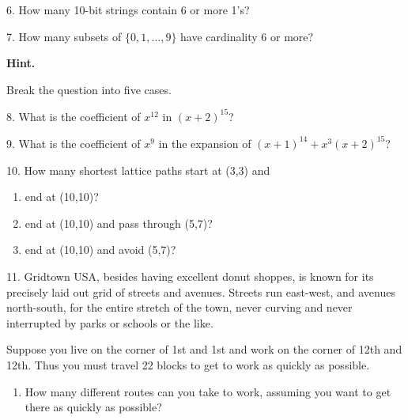\documentclass[10pt,]{book}
\theoremstyle{plain}
\theoremstyle{definition}
\numberwithin{equation}{chapter}
\begin{document}
\begin{exerciselist}
\par\smallskip
\item[6.]\hypertarget{exercise-61}{}
            How many 10-bit strings contain 6 or more 1's?
\par\smallskip
\item[7.]\hypertarget{exercise-62}{}
            How many subsets of \(\{0,1,\ldots, 9\}\) have cardinality 6 or more?
\par\smallskip
\par\smallskip
\noindent\textbf{Hint.}\hypertarget{hint-5}{}\quad

            Break the question into five cases.
\item[8.]\hypertarget{exercise-63}{}
            What is the coefficient of \(x^{12}\) in \((x+2)^{15}\)?
\par\smallskip
\item[9.]\hypertarget{exercise-64}{}
            What is the coefficient of \(x^9\) in the expansion of \((x+1)^{14} + x^3(x+2)^{15}\)?
\par\smallskip
\item[10.]\hypertarget{exercise-65}{}
            How many shortest lattice paths start at (3,3) and
          \leavevmode%
\begin{enumerate}[label=(\alph*)]
\item\hypertarget{li-242}{} end at (10,10)? %
\item\hypertarget{li-243}{} end at (10,10) and pass through (5,7)? %
\item\hypertarget{li-244}{} end at (10,10) and avoid (5,7)? %
\end{enumerate}

\par\smallskip
\item[11.]\hypertarget{exercise-66}{}
            Gridtown USA, besides having excellent donut shoppes, is known for its precisely laid out grid of streets and avenues. Streets run east-west, and avenues north-south, for the entire stretch of the town, never curving and never interrupted by parks or schools or the like.
\par

            Suppose you live on the corner of 1st and 1st and work on the corner of 12th and 12th. Thus you must travel 22 blocks to get to work as quickly as possible.
          \leavevmode%
\begin{enumerate}[label=(\alph*)]
\item\hypertarget{li-248}{}
                How many different routes can you take to work, assuming you want to get there as quickly as possible?



\end{enumerate}
\end{exerciselist}
\end{document}
